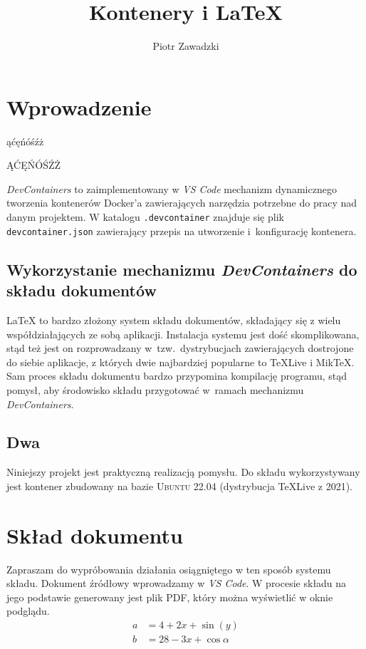 \documentclass{article}
\author{Piotr Zawadzki}
\title{Kontenery i \LaTeX}
\newcommand{\devc}{\textit{DevContainers}\xspace}
\newcommand{\vsc}{\textit{VS Code}\xspace}
\begin{document}
\maketitle{}

\tableofcontents{}

\section{Wprowadzenie}

ąćęńóśźż

ĄĆĘŃÓŚŹŻ

\devc{} to zaimplementowany w \vsc{} mechanizm dynamicznego tworzenia kontenerów Docker'a zawierających narzędzia potrzebne do pracy nad danym projektem.
W katalogu \texttt{.devcontainer} znajduje się plik
\texttt{devcontainer.json} zawierający przepis na utworzenie i~konfigurację kontenera.

\subsection{Wykorzystanie mechanizmu \devc{} do składu dokumentów}

\LaTeX{} to bardzo złożony system składu dokumentów, składający się z wielu współdziałających ze sobą aplikacji.
Instalacja systemu jest dość skomplikowana, stąd też jest on rozprowadzany w~tzw.~dystrybucjach zawierających dostrojone do siebie aplikacje, z których dwie najbardziej popularne to \TeX{}Live i Mik\TeX{}.
Sam proces składu dokumentu bardzo przypomina kompilację programu, stąd pomysł, aby środowisko składu przygotować w~ramach mechanizmu \devc{}.

\subsection{Dwa}

Niniejszy projekt jest praktyczną realizacją pomysłu.
Do składu wykorzystywany jest kontener zbudowany na bazie \textsc{Ubuntu 22.04} (dystrybucja \TeX{}Live z 2021).

\section{Skład dokumentu}

Zapraszam do wypróbowania działania osiągniętego w ten sposób systemu składu.
Dokument źródłowy wprowadzamy w \vsc{}.
W procesie składu na jego podstawie generowany jest plik PDF, który można wyświetlić w oknie podglądu.
\begin{align}
  a & = 4+2x+\sin(y)         \\
  b & = 28 -3 x + \cos\alpha
\end{align}
\end{document}
